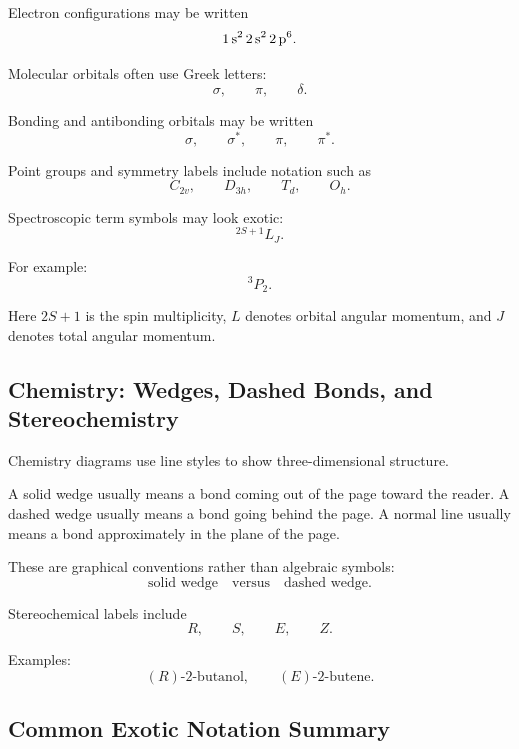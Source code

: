 \documentclass[11pt,twocolumn]{article}
\begin{document}
Electron configurations may be written
\[
\ce{1s^2 2s^2 2p^6}.
\]

Molecular orbitals often use Greek letters:
\[
\sigma,
\qquad
\pi,
\qquad
\delta.
\]

Bonding and antibonding orbitals may be written
\[
\sigma,
\qquad
\sigma^*,
\qquad
\pi,
\qquad
\pi^*.
\]

Point groups and symmetry labels include notation such as
\[
C_{2v},
\qquad
D_{3h},
\qquad
T_d,
\qquad
O_h.
\]

Spectroscopic term symbols may look exotic:
\[
{}^{2S+1}L_J.
\]

For example:
\[
{}^3P_2.
\]

Here \(2S+1\) is the spin multiplicity, \(L\) denotes orbital angular momentum,
and \(J\) denotes total angular momentum.

\subsection{Chemistry: Wedges, Dashed Bonds, and Stereochemistry}

Chemistry diagrams use line styles to show three-dimensional structure.

A solid wedge usually means a bond coming out of the page toward the reader.
A dashed wedge usually means a bond going behind the page. A normal line usually
means a bond approximately in the plane of the page.

These are graphical conventions rather than algebraic symbols:
\[
\text{solid wedge}
\quad
\text{versus}
\quad
\text{dashed wedge}.
\]

Stereochemical labels include
\[
R,
\qquad
S,
\qquad
E,
\qquad
Z.
\]

Examples:
\[
(R)\text{-2-butanol},
\qquad
(E)\text{-2-butene}.
\]

\subsection{Common Exotic Notation Summary}
\end{document}
